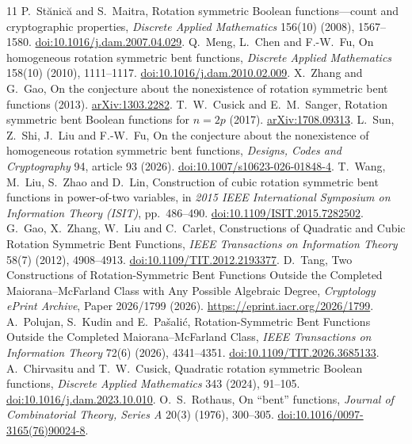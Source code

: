 \documentclass[11pt,a4paper]{article}
\theoremstyle{remark}
\theoremstyle{plain}
\begin{document}
\begin{thebibliography}{11}
 P.~St\u{a}nic\u{a} and S.~Maitra, Rotation symmetric Boolean functions---count and cryptographic properties, \emph{Discrete Applied Mathematics} 156(10) (2008), 1567--1580. \href{https://doi.org/10.1016/j.dam.2007.04.029}{doi:10.1016/j.dam.2007.04.029}.
 Q.~Meng, L.~Chen and F.-W.~Fu, On homogeneous rotation symmetric bent functions, \emph{Discrete Applied Mathematics} 158(10) (2010), 1111--1117. \href{https://doi.org/10.1016/j.dam.2010.02.009}{doi:10.1016/j.dam.2010.02.009}.
 X.~Zhang and G.~Gao, On the conjecture about the nonexistence of rotation symmetric bent functions (2013). \href{https://arxiv.org/abs/1303.2282}{arXiv:1303.2282}.
 T.~W.~Cusick and E.~M.~Sanger, Rotation symmetric bent Boolean functions for $n=2p$ (2017). \href{https://arxiv.org/abs/1708.09313}{arXiv:1708.09313}.
 L.~Sun, Z.~Shi, J.~Liu and F.-W.~Fu, On the conjecture about the nonexistence of homogeneous rotation symmetric bent functions, \emph{Designs, Codes and Cryptography} 94, article 93 (2026). \href{https://doi.org/10.1007/s10623-026-01848-4}{doi:10.1007/s10623-026-01848-4}.
 T.~Wang, M.~Liu, S.~Zhao and D.~Lin, Construction of cubic rotation symmetric bent functions in power-of-two variables, in \emph{2015 IEEE International Symposium on Information Theory (ISIT)}, pp.~486--490. \href{https://doi.org/10.1109/ISIT.2015.7282502}{doi:10.1109/ISIT.2015.7282502}.
 G.~Gao, X.~Zhang, W.~Liu and C.~Carlet, Constructions of Quadratic and Cubic Rotation Symmetric Bent Functions, \emph{IEEE Transactions on Information Theory} 58(7) (2012), 4908--4913. \href{https://doi.org/10.1109/TIT.2012.2193377}{doi:10.1109/TIT.2012.2193377}.
 D.~Tang, Two Constructions of Rotation-Symmetric Bent Functions Outside the Completed Maiorana--McFarland Class with Any Possible Algebraic Degree, \emph{Cryptology ePrint Archive}, Paper 2026/1799 (2026). \url{https://eprint.iacr.org/2026/1799}.
 A.~Polujan, S.~Kudin and E.~Pa\v{s}ali\'c, Rotation-Symmetric Bent Functions Outside the Completed Maiorana--McFarland Class, \emph{IEEE Transactions on Information Theory} 72(6) (2026), 4341--4351. \href{https://doi.org/10.1109/TIT.2026.3685133}{doi:10.1109/TIT.2026.3685133}.
 A.~Chirvasitu and T.~W.~Cusick, Quadratic rotation symmetric Boolean functions, \emph{Discrete Applied Mathematics} 343 (2024), 91--105. \href{https://doi.org/10.1016/j.dam.2023.10.010}{doi:10.1016/j.dam.2023.10.010}.
 O.~S.~Rothaus, On ``bent'' functions, \emph{Journal of Combinatorial Theory, Series A} 20(3) (1976), 300--305. \href{https://doi.org/10.1016/0097-3165(76)90024-8}{doi:10.1016/0097-3165(76)90024-8}.
\end{thebibliography}
\end{document}
